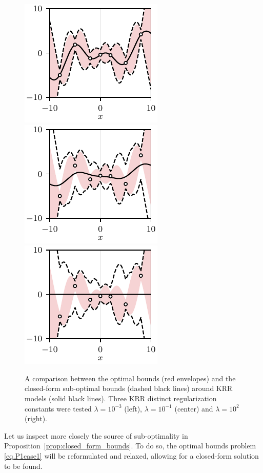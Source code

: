 \begin{figure}[b]
	\centering
	\includegraphics{../images/chap2_ex4_cf_bounds_A.pdf} 
	\includegraphics{../images/chap2_ex4_cf_bounds_B.pdf} 
	\includegraphics{../images/chap2_ex4_cf_bounds_C.pdf} 
	\caption{A comparison between the optimal bounds (red envelopes) and the closed-form sub-optimal bounds (dashed black lines) around KRR models (solid black lines). Three KRR distinct regularization constants were tested $\lambda = 10^{-3}$ (left), $\lambda = 10^{-1}$ (center) and $\lambda = 10^{2}$ (right).}
	\label{fig.ex4}
\end{figure}

Let us inspect more closely the source of sub-optimality in Proposition~\ref{prop:closed_form_bounds}. To do so, the optimal bounds problem \eqref{eq.P1case1} will be reformulated and relaxed, allowing for a closed-form solution to be found. 

